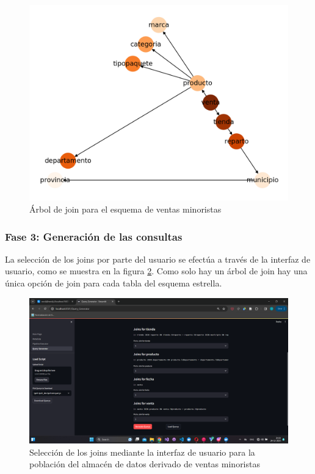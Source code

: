 \begin{figure}
  \centering
  \includegraphics[scale=0.6]{Graphics/jointree1.png}
  \caption{\'Arbol de join para el esquema de ventas minoristas}
  \label{fig:jointree1}
\end{figure}

\subsubsection{Fase 3: Generaci\'on de las consultas}

La selecci\'on de los joins por parte del usuario se efectúa a través de la interfaz de usuario, como se 
muestra en la figura \ref{fig:ui1}. Como solo hay un \'arbol de join hay una \'unica opción de join para 
cada tabla del esquema estrella.

\begin{figure}
  \centering
  \includegraphics[scale=0.4]{Graphics/ui1.png}
  \caption{Selecci\'on de los joins mediante la interfaz de usuario para la poblaci\'on del almacén de datos derivado de ventas minoristas}
  \label{fig:ui1}
\end{figure}

